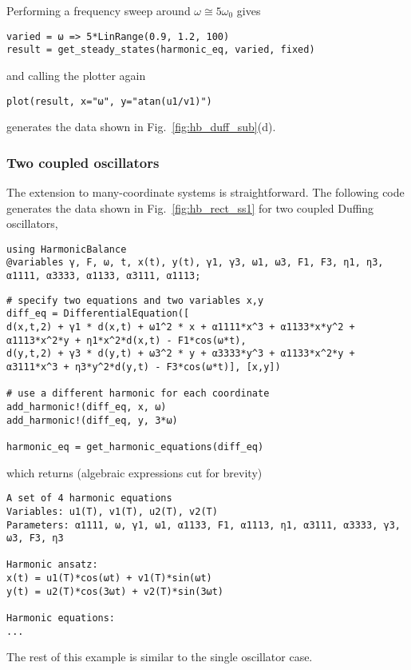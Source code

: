 Performing a frequency sweep around $\omega \cong 5 \omega_0$ gives
%
\begin{lstlisting}[numbers=none]
varied = ω => 5*LinRange(0.9, 1.2, 100)
result = get_steady_states(harmonic_eq, varied, fixed)
\end{lstlisting}
%
and calling the plotter again
\begin{lstlisting}[numbers=none]
plot(result, x="ω", y="atan(u1/v1)")
\end{lstlisting}
generates the data shown in Fig.~\ref{fig:hb_duff_sub}(d).

\subsubsection{Two coupled oscillators} 

The extension to many-coordinate systems is straightforward. The following code generates the data shown in Fig.~\ref{fig:hb_rect_ss1} for two coupled Duffing oscillators,
\begin{lstlisting}[numbers=none]
using HarmonicBalance
@variables γ, F, ω, t, x(t), y(t), γ1, γ3, ω1, ω3, F1, F3, η1, η3, α1111, α3333, α1133, α3111, α1113;
\end{lstlisting}

\begin{lstlisting}[numbers=none]
# specify two equations and two variables x,y
diff_eq = DifferentialEquation([
d(x,t,2) + γ1 * d(x,t) + ω1^2 * x + α1111*x^3 + α1133*x*y^2 + α1113*x^2*y + η1*x^2*d(x,t) - F1*cos(ω*t), 
d(y,t,2) + γ3 * d(y,t) + ω3^2 * y + α3333*y^3 + α1133*x^2*y + α3111*x^3 + η3*y^2*d(y,t) - F3*cos(ω*t)], [x,y])

# use a different harmonic for each coordinate
add_harmonic!(diff_eq, x, ω)
add_harmonic!(diff_eq, y, 3*ω)

harmonic_eq = get_harmonic_equations(diff_eq)
\end{lstlisting}
which returns (algebraic expressions cut for brevity)
\begin{lstlisting}[numbers=none, basicstyle=\scriptsize\ttfamily]
A set of 4 harmonic equations
Variables: u1(T), v1(T), u2(T), v2(T)
Parameters: α1111, ω, γ1, ω1, α1133, F1, α1113, η1, α3111, α3333, γ3, ω3, F3, η3

Harmonic ansatz: 
x(t) = u1(T)*cos(ωt) + v1(T)*sin(ωt)
y(t) = u2(T)*cos(3ωt) + v2(T)*sin(3ωt)

Harmonic equations:
...
\end{lstlisting}
The rest of this example is similar to the single oscillator case. 


